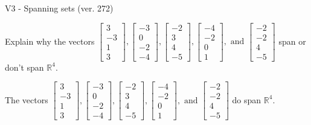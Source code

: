 \begin{exercise}
  \begin{exerciseTitle}V3 - Spanning sets (ver. 272)\end{exerciseTitle}
  \begin{exerciseStatement}
    Explain why the vectors \(\left[\begin{array}{r}
3 \\
-3 \\
1 \\
3
\end{array}\right] , \left[\begin{array}{r}
-3 \\
0 \\
-2 \\
-4
\end{array}\right] , \left[\begin{array}{r}
-2 \\
3 \\
4 \\
-5
\end{array}\right] , \left[\begin{array}{r}
-4 \\
-2 \\
0 \\
1
\end{array}\right] , \text{ and } \left[\begin{array}{r}
-2 \\
-2 \\
4 \\
-5
\end{array}\right]\) span or don't span \(\mathbb{R}^4\). 
	


  \end{exerciseStatement}
  \begin{exerciseAnswer}
   The vectors \(\left[\begin{array}{r}
3 \\
-3 \\
1 \\
3
\end{array}\right] , \left[\begin{array}{r}
-3 \\
0 \\
-2 \\
-4
\end{array}\right] , \left[\begin{array}{r}
-2 \\
3 \\
4 \\
-5
\end{array}\right] , \left[\begin{array}{r}
-4 \\
-2 \\
0 \\
1
\end{array}\right] , \text{ and } \left[\begin{array}{r}
-2 \\
-2 \\
4 \\
-5
\end{array}\right]\) 
  	 do  
	span \(\mathbb{R}^4\).
  



\end{exerciseAnswer}
\end{exercise}
